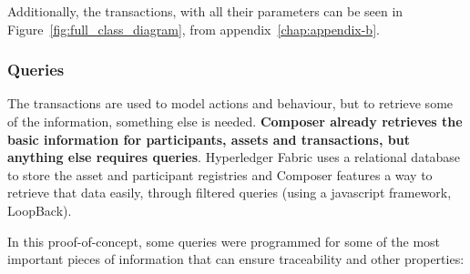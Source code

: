 Additionally, the transactions, with all their parameters can be seen in Figure~\ref{fig:full_class_diagram}, from appendix~\ref{chap:appendix-b}.

\subsubsection*{Queries}
The transactions are used to model actions and behaviour, but to retrieve some of the information, something else is needed. \textbf{Composer already retrieves the basic information for participants, assets and transactions, but anything else requires queries}. Hyperledger Fabric uses a relational database to store the asset and participant registries and Composer features a way to retrieve that data easily, through filtered queries (using a javascript framework, LoopBack).

In this proof-of-concept, some queries were programmed for some of the most important pieces of information that can ensure traceability and other properties:


